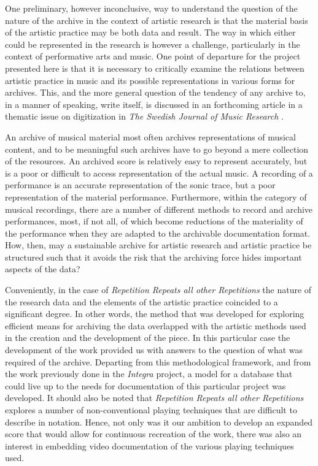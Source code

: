 \documentclass[,a4paper]{llncs}
\begin{document}
One preliminary, however inconclusive, way to understand the question of the nature of the archive in the context of artistic research is that the material basis of the artistic practice may be both data and result. The way in which either could be represented in the research is however a challenge, particularly in the context of performative arts and music. One point of departure for the project presented here is that it is necessary to critically examine the relations between artistic practice in music and its possible representations in various forms for archives. This, and the more general question of the tendency of any archive to, in a manner of speaking, write itself, is discussed in an forthcoming article in a thematic issue on digitization in \emph{The Swedish Journal of Music Research} \cite{frisk2018}.

An archive of musical material most often archives representations of musical content, and to be meaningful such archives have to go beyond a mere collection of the resources. An archived score is relatively easy to represent accurately, but is a poor or difficult to access representation of the actual music. A recording of a performance is an accurate representation of the sonic trace, but a poor representation of the material performance. Furthermore, within the category of musical recordings, there are a number of different methods to record and archive performances, most, if not all, of which become reductions of the materiality of the performance when they are adapted to the archivable documentation format. How, then, may a sustainable archive for artistic research and artistic practice be structured such that it avoids the risk that the archiving force hides important aspects of the data? 

Conveniently, in the case of \emph{Repetition Repeats all other Repetitions} the nature of the research data and the elements of the artistic practice coincided to a significant degree. In other words, the method that was developed for exploring efficient means for archiving the data overlapped with the artistic methods used in the creation and the development of the piece. In this particular case the development of the work provided us with answers to the question of what was required of the archive. Departing from this methodological framework, and from the work previously done in the \emph{Integra} project, a model for a database that could live up to the needs for documentation of this particular project was developed. It should also be noted that \emph{Repetition Repeats all other Repetitions} explores a number of non-conventional playing techniques that are difficult to describe in notation. Hence, not only was it our ambition to develop an expanded score that would allow for continuous recreation of the work, there was also an interest in embedding video documentation of the various playing techniques used.
\end{document}
